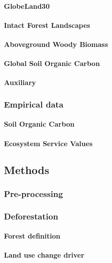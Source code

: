 		\paragraph{GlobeLand30}
		\paragraph{Intact Forest Landscapes}
		\paragraph{Aboveground Woody Biomass}
		\paragraph{Global Soil Organic Carbon}
		\paragraph{Auxiliary}

	\subsubsection{Empirical data}
		\paragraph{Soil Organic Carbon}
		\paragraph{Ecosystem Service Values}


\subsection{Methods}
\label{subsec:methods}

	\subsubsection{Pre-processing}

	\subsubsection{Deforestation}
		\paragraph{Forest definition}
		\paragraph{Land use change driver}
